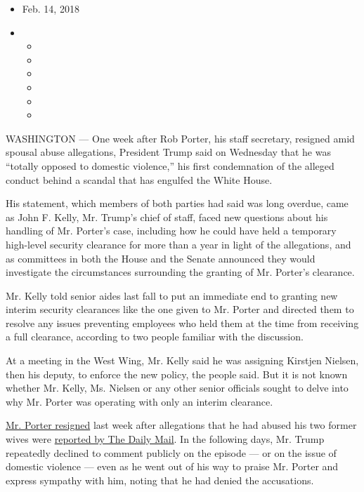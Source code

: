 \begin{itemize}
\item
  Feb. 14, 2018
\item
  \begin{itemize}
  \item
  \item
  \item
  \item
  \item
  \item
  \end{itemize}
\end{itemize}

WASHINGTON --- One week after Rob Porter, his staff secretary, resigned
amid spousal abuse allegations, President Trump said on Wednesday that
he was ``totally opposed to domestic violence,'' his first condemnation
of the alleged conduct behind a scandal that has engulfed the White
House.

His statement, which members of both parties had said was long overdue,
came as John F. Kelly, Mr. Trump's chief of staff, faced new questions
about his handling of Mr. Porter's case, including how he could have
held a temporary high-level security clearance for more than a year in
light of the allegations, and as committees in both the House and the
Senate announced they would investigate the circumstances surrounding
the granting of Mr. Porter's clearance.

Mr. Kelly told senior aides last fall to put an immediate end to
granting new interim security clearances like the one given to Mr.
Porter and directed them to resolve any issues preventing employees who
held them at the time from receiving a full clearance, according to two
people familiar with the discussion.

At a meeting in the West Wing, Mr. Kelly said he was assigning Kirstjen
Nielsen, then his deputy, to enforce the new policy, the people said.
But it is not known whether Mr. Kelly, Ms. Nielsen or any other senior
officials sought to delve into why Mr. Porter was operating with only an
interim clearance.

\href{https://www.nytimes3xbfgragh.onion/2018/02/07/us/politics/rob-porter-resigns-abuse-white-house-staff-secretary.html}{Mr.
Porter resigned} last week after allegations that he had abused his two
former wives were
\href{http://www.dailymail.co.uk/news/article-5359731/Ex-wife-Rob-Porter-Trumps-secretary-tells-marriage.html}{reported
by The Daily Mail}. In the following days, Mr. Trump repeatedly declined
to comment publicly on the episode --- or on the issue of domestic
violence --- even as he went out of his way to praise Mr. Porter and
express sympathy with him, noting that he had denied the accusations.

